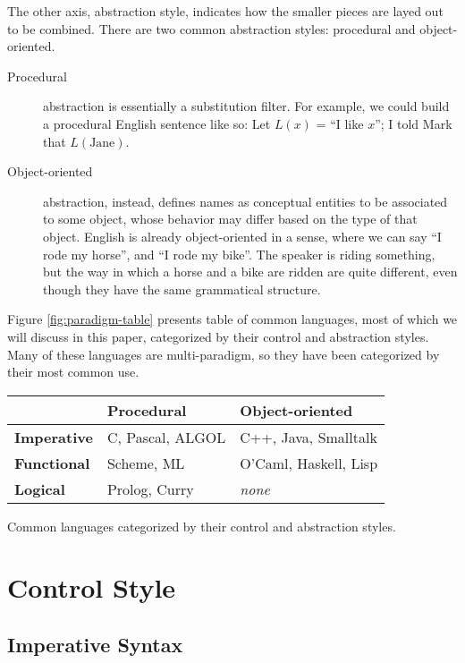 \documentclass[12pt]{article}
\begin{document}
The other axis, abstraction style, indicates how the smaller pieces are
layed out to be combined.  There are two common abstraction styles:
procedural and object-oriented.

\begin{description}
\item[Procedural] abstraction is essentially a substitution filter.  For
example, we could build a procedural English sentence like so: Let
$\mathit{L}(x)$ = ``I like $x$''; I told Mark that $L(\text{Jane})$.
\item[Object-oriented] abstraction, instead, defines names as conceptual
entities to be associated to some object, whose behavior may differ
based on the type of that object.  English is already object-oriented in
a sense, where we can say ``I rode my horse'', and ``I rode my bike''.
The speaker is riding something, but the way in which a horse and a bike
are ridden are quite different, even though they have the same
grammatical structure.
\end{description}

Figure \ref{fig:paradigm-table} presents table of common languages, most
of which we will discuss in this paper, categorized by their control and
abstraction styles.  Many of these languages are multi-paradigm, so they
have been categorized by their most common use.

\begin{Figure}
\label{fig:paradigm-table}
\begin{tabular}{l|ll}
                      & \textbf{Procedural}  & \textbf{Object-oriented} \\
  \hline
  \textbf{Imperative} & C, Pascal, ALGOL     & C++, Java, Smalltalk \\
  \textbf{Functional} & Scheme, ML           & O'Caml, Haskell, Lisp \\
  \textbf{Logical}    & Prolog, Curry        & \textit{none} \\
\end{tabular}
\caption{Common languages categorized by their control and abstraction
styles.} 
\end{Figure}

\section{Control Style}

\subsection{Imperative Syntax}
\end{document}
